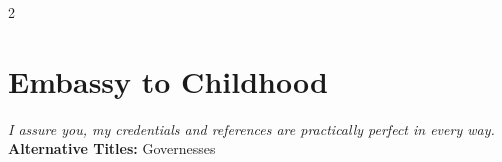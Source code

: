 \begin{multicols}{2}

\section*{Embassy to Childhood}
\label{sec:EmbassyChildhood}

\textit{I assure you, my credentials and references are practically perfect in every way.}\\

\noindent \textbf{Alternative Titles:} Governesses\\


\end{multicols}
